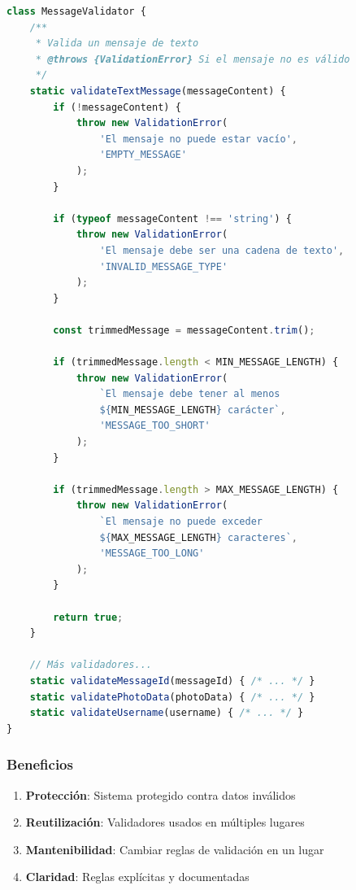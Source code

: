 \documentclass[12pt,a4paper]{article}
\begin{document}
\begin{lstlisting}[caption=messageValidator.js - Validación Completa, language=JavaScript]
class MessageValidator {
    /**
     * Valida un mensaje de texto
     * @throws {ValidationError} Si el mensaje no es válido
     */
    static validateTextMessage(messageContent) {
        if (!messageContent) {
            throw new ValidationError(
                'El mensaje no puede estar vacío',
                'EMPTY_MESSAGE'
            );
        }

        if (typeof messageContent !== 'string') {
            throw new ValidationError(
                'El mensaje debe ser una cadena de texto',
                'INVALID_MESSAGE_TYPE'
            );
        }

        const trimmedMessage = messageContent.trim();

        if (trimmedMessage.length < MIN_MESSAGE_LENGTH) {
            throw new ValidationError(
                `El mensaje debe tener al menos 
                ${MIN_MESSAGE_LENGTH} carácter`,
                'MESSAGE_TOO_SHORT'
            );
        }

        if (trimmedMessage.length > MAX_MESSAGE_LENGTH) {
            throw new ValidationError(
                `El mensaje no puede exceder 
                ${MAX_MESSAGE_LENGTH} caracteres`,
                'MESSAGE_TOO_LONG'
            );
        }

        return true;
    }

    // Más validadores...
    static validateMessageId(messageId) { /* ... */ }
    static validatePhotoData(photoData) { /* ... */ }
    static validateUsername(username) { /* ... */ }
}
\end{lstlisting}

\subsubsection{Beneficios}
\begin{enumerate}
    \item \textbf{Protección}: Sistema protegido contra datos inválidos
    \item \textbf{Reutilización}: Validadores usados en múltiples lugares
    \item \textbf{Mantenibilidad}: Cambiar reglas de validación en un lugar
    \item \textbf{Claridad}: Reglas explícitas y documentadas
\end{enumerate}
\end{document}

